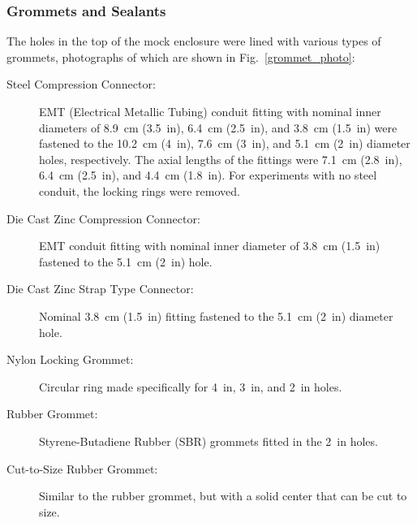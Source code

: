 \FloatBarrier

\subsubsection{Grommets and Sealants}

The holes in the top of the mock enclosure were lined with various types of grommets, photographs of which are shown in Fig.~\ref{grommet_photo}:
\begin{description}
\item[Steel Compression Connector:] EMT (Electrical Metallic Tubing) conduit fitting with nominal inner diameters of 8.9~cm (3.5~in), 6.4~cm (2.5~in), and 3.8~cm (1.5~in) were fastened to the 10.2~cm (4~in), 7.6~cm (3~in), and 5.1~cm (2~in) diameter holes, respectively. The axial lengths of the fittings were 7.1~cm (2.8~in), 6.4~cm (2.5~in), and 4.4~cm (1.8~in). For experiments with no steel conduit, the locking rings were removed.
\item[Die Cast Zinc Compression Connector:] EMT conduit fitting with nominal inner diameter of 3.8~cm (1.5~in) fastened to the 5.1~cm (2~in) hole.
\item[Die Cast Zinc Strap Type Connector:] Nominal 3.8~cm (1.5~in) fitting fastened to the 5.1~cm (2~in) diameter hole.
\item[Nylon Locking Grommet:] Circular ring made specifically for 4~in, 3~in, and 2~in holes.
\item[Rubber Grommet:] Styrene-Butadiene Rubber (SBR) grommets fitted in the 2~in holes.
\item[Cut-to-Size Rubber Grommet:] Similar to the rubber grommet, but with a solid center that can be cut to size.
\end{description}

